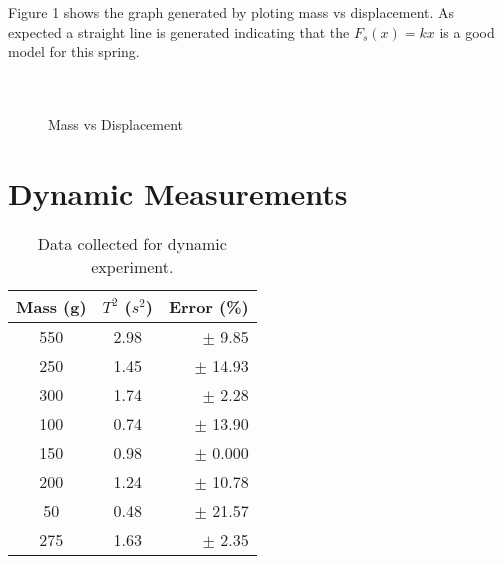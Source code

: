 \documentclass{article}
\begin{document}
Figure 1 shows the graph generated by ploting mass vs displacement. As expected a straight line is generated indicating that the $F_s(x) = kx$ is a good model for this spring. \\\\\\

\begin{figure}[h]
\caption{Mass vs Displacement}
\end{figure}



\section{Dynamic Measurements}

\begin{wraptable}{r}{5.5cm}
\caption{Data collected for dynamic experiment.}
\begin{tabular}{c|c|r}
Mass (g) & $T^2$ ($s^2$) & Error (\%) \\\hline
550 & 2.98 & $\pm$ 9.85 \\
250 & 1.45 & $\pm$ 14.93 \\
300 & 1.74 & $\pm$ 2.28 \\
100 & 0.74 & $\pm$ 13.90 \\
150 & 0.98 & $\pm$ 0.000 \\
200 & 1.24 & $\pm$ 10.78 \\
50 & 0.48 & $\pm$ 21.57 \\
275 & 1.63 & $\pm$ 2.35 \\

\end{tabular}
\end{wraptable}
\end{document}

